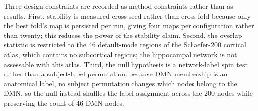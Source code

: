 Three design constraints are recorded as method constraints rather than as results. First,
stability is measured cross-seed rather than cross-fold because only the best fold's map is
persisted per run, giving four maps per configuration rather than twenty; this reduces the power of
the stability claim. Second, the overlap statistic is restricted to the 46 default-mode
regions of the Schaefer-200 cortical atlas, which contains no subcortical regions; the
hippocampal network is not assessable with this atlas. Third, the null hypothesis is a network-label
spin test rather than a subject-label permutation: because \ac{DMN} membership is an
anatomical label, no subject permutation changes which nodes belong to the \ac{DMN}, so
the null instead shuffles the label assignment across the 200 nodes while preserving the
count of 46 \ac{DMN} nodes.
